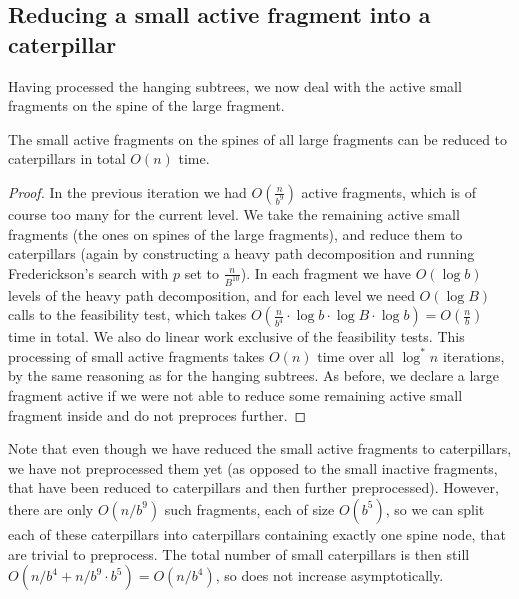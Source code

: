 \documentclass[a4paper,UKenglish]{lipics-v2016}
\theoremstyle{plain}
\begin{document}
\subsection{Reducing a small active fragment into a caterpillar}\label{section:lemma2}
Having processed the hanging subtrees, we now deal with the active small fragments on the spine of the large fragment. 

\begin{lemma}\label{lemma2}
	The small active fragments on the spines of all large fragments can be reduced to caterpillars in total $O(n)$ time. 
\end{lemma}
\begin{proof}

In the previous iteration we had $O(\frac{n}{b^9})$ active fragments, which is of course
too many for the current level. We take the remaining active small fragments (the ones on spines of the large 
fragments), and reduce them to caterpillars (again by constructing a heavy path decomposition and running
Frederickson's search with $p$ set to $\frac{n}{B^{10}}$). In each fragment we have $O(\log b)$ levels of the heavy
path decomposition, and for each level we need $O(\log B)$ calls to the feasibility test, which takes
$O(\frac{n}{b^4} \cdot \log b \cdot \log B \cdot \log b) = O(\frac{n}{b})$ time in total. We also do linear
work exclusive of the feasibility tests. This processing of small active fragments takes $O(n)$ time over all
$\log ^*n$ iterations, by the same reasoning as for the hanging subtrees.
As before, we declare a large fragment active if we were not able to reduce some remaining active small
fragment inside and do not preproces further.
\end{proof}

Note that even though we have reduced the small active fragments to caterpillars, we have not preprocessed them yet
(as opposed to the small inactive fragments, that have been reduced to caterpillars and then further preprocessed).
However, there are only $O(n/b^{9})$ such fragments, each of size $O(b^{5})$, so we can split each
of these caterpillars into caterpillars containing exactly one spine node, that are trivial to preprocess.
The total number of small caterpillars is then still $O(n/b^{4}+n/b^{9}\cdot b^{5})=O(n/b^{4})$,
so does not increase asymptotically.

\end{document}
